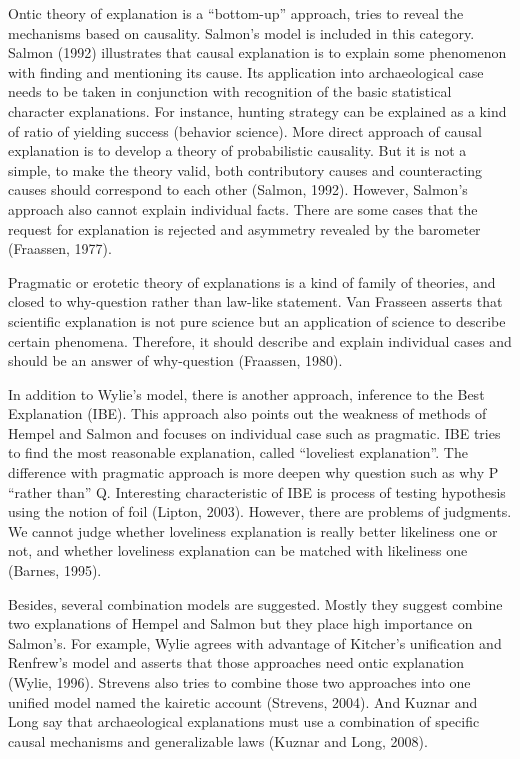 \documentclass[american,man]{apa6}
\begin{document}
Ontic theory of explanation is a \enquote{bottom-up} approach, tries to
reveal the mechanisms based on causality. Salmon's model is included in
this category. Salmon (1992) illustrates that causal explanation is to
explain some phenomenon with finding and mentioning its cause. Its
application into archaeological case needs to be taken in conjunction
with recognition of the basic statistical character explanations. For
instance, hunting strategy can be explained as a kind of ratio of
yielding success (behavior science). More direct approach of causal
explanation is to develop a theory of probabilistic causality. But it is
not a simple, to make the theory valid, both contributory causes and
counteracting causes should correspond to each other (Salmon, 1992).
However, Salmon's approach also cannot explain individual facts. There
are some cases that the request for explanation is rejected and
asymmetry revealed by the barometer (Fraassen, 1977).

Pragmatic or erotetic theory of explanations is a kind of family of
theories, and closed to why-question rather than law-like statement. Van
Frasseen asserts that scientific explanation is not pure science but an
application of science to describe certain phenomena. Therefore, it
should describe and explain individual cases and should be an answer of
why-question (Fraassen, 1980).

In addition to Wylie's model, there is another approach, inference to
the Best Explanation (IBE). This approach also points out the weakness
of methods of Hempel and Salmon and focuses on individual case such as
pragmatic. IBE tries to find the most reasonable explanation, called
\enquote{loveliest explanation}. The difference with pragmatic approach
is more deepen why question such as why P \enquote{rather than} Q.
Interesting characteristic of IBE is process of testing hypothesis using
the notion of foil (Lipton, 2003). However, there are problems of
judgments. We cannot judge whether loveliness explanation is really
better likeliness one or not, and whether loveliness explanation can be
matched with likeliness one (Barnes, 1995).

Besides, several combination models are suggested. Mostly they suggest
combine two explanations of Hempel and Salmon but they place high
importance on Salmon's. For example, Wylie agrees with advantage of
Kitcher's unification and Renfrew's model and asserts that those
approaches need ontic explanation (Wylie, 1996). Strevens also tries to
combine those two approaches into one unified model named the kairetic
account (Strevens, 2004). And Kuznar and Long say that archaeological
explanations must use a combination of specific causal mechanisms and
generalizable laws (Kuznar and Long, 2008).
\end{document}

